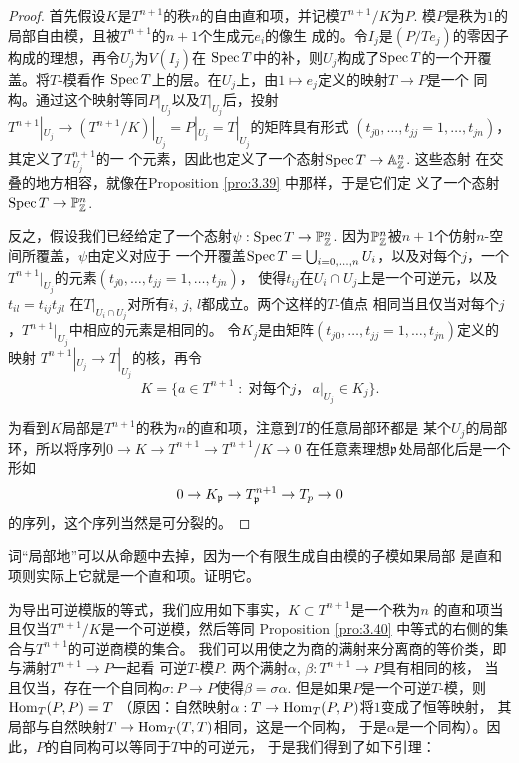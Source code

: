 \begin{proof}
	首先假设$K$是$T^{n+1}$的秩$n$的自由直和项，并记模$T^{n+1}/K$为$P$. 
	模$P$是秩为$1$的局部自由模，且被$T^{n+1}$的$n+1$个生成元$e_i$的像生
	成的。令$I_j$是$(P/Te_j)$的零因子构成的理想，再令$U_j$为$V(I_j)$在
	$\operatorname{Spec} T$中的补，则$U_j$构成了$\operatorname{Spec} T$的一个开覆盖。将$T$-模看作
	$\operatorname{Spec} T$上的层。在$U_j$上，由$1\mapsto e_j$定义的映射$T\to P$是一个
	同构。通过这个映射等同$P|_{U_j}$以及$T|_{U_j}$后，投射$T^{n+1}|_{U_j}
	\to (T^{n+1}/K)|_{U_j}=P|_{U_j}=T|_{U_j}$的矩阵具有形式
	$(t_{j0},\dots,t_{jj}=1,\dots,t_{jn})$，其定义了$T^{n+1}_{U_j}$的一
	个元素，因此也定义了一个态射$\operatorname{Spec} T\to \mathbb A_{\mathbb{Z}}^n$. 这些态射
	在交叠的地方相容，就像在Proposition \ref{pro:3.39} 中那样，于是它们定
	义了一个态射$\operatorname{Spec} T\to \mathbb P_{\mathbb{Z}}^n$.

	反之，假设我们已经给定了一个态射$\psi:\operatorname{Spec} T\to \mathbb P_{\mathbb{Z}}^n$. 
	因为$\mathbb P_{\mathbb{Z}}^n$被$n+1$个仿射$n$-空间所覆盖，$\psi$由定义对应于
	一个开覆盖$\operatorname{Spec} T=\bigcup_{i=0,\dots,n}U_i$，以及对每个$j$，一个
	$T^{n+1}|_{U_j}$的元素$(t_{j0},\dots,t_{jj}=1,\dots,t_{jn})$，
	使得$t_{ij}$在$U_i\cap U_j$上是一个可逆元，以及$t_{il}=t_{ij}t_{jl}$
	在$T|_{U_i\cap U_j}$对所有$i$, $j$, $l$都成立。两个这样的$T$-值点
	相同当且仅当对每个$j$，$T^{n+1}|_{U_j}$中相应的元素是相同的。%
	令$K_j$是由矩阵$(t_{j0},\dots,t_{jj}=1,\dots,t_{jn})$定义的映射
	$T^{n+1}|_{U_j}\to T|_{U_j}$的核，再令
	\[
	K=\{a\in T^{n+1}\;:\; \text{对每个$j$，}\, a|_{U_j}\in K_j\}.
	\]

	为看到$K$局部是$T^{n+1}$的秩为$n$的直和项，注意到$T$的任意局部环都是
	某个$U_j$的局部环，所以将序列$0\to K\to T^{n+1}\to T^{n+1}/K\to 0$
	在任意素理想$\mathfrak{p}$处局部化后是一个形如
	\[
		0\to K_{\mathfrak{p}}\to T^{n+1}_{\mathfrak{p}} \to T_p\to 0
	\]
	的序列，这个序列当然是可分裂的。
\end{proof}

\begin{exe}\label{exe:3.41}
	词“局部地”可以从命题中去掉，因为一个有限生成自由模的子模如果局部
	是直和项则实际上它就是一个直和项。证明它。
\end{exe}

为导出可逆模版的等式，我们应用如下事实，$K\subset T^{n+1}$是一个秩为$n$
的直和项当且仅当$T^{n+1}/K$是一个可逆模，然后等同
Proposition \ref{pro:3.40} 中等式的右侧的集合与$T^{n+1}$的可逆商模的集合。
我们可以用使之为商的满射来分离商的等价类，即与满射$T^{n+1}\to P$一起看
可逆$T$-模$P$. 两个满射$\alpha$, $\beta:T^{n+1}\to P$具有相同的核，
当且仅当，存在一个自同构$\sigma:P\to P$使得$\beta=\sigma\alpha$. 
但是如果$P$是一个可逆$T$-模，则$\operatorname{Hom}_T(P,P)=T$
（原因：自然映射$\alpha:T\to \operatorname{Hom}_T(P,P)$将$1$变成了恒等映射，
其局部与自然映射$T\to \operatorname{Hom}_T(T,T)$相同，这是一个同构，
于是$\alpha$是一个同构）。因此，$P$的自同构可以等同于$T$中的可逆元，
于是我们得到了如下引理：

